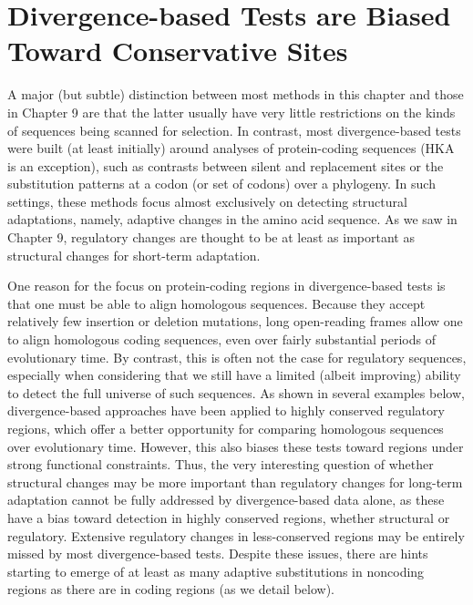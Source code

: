 \documentclass{article}
\begin{document}
\section{Divergence-based Tests are Biased Toward Conservative Sites}
A major (but subtle) distinction between most methods in this chapter and those in Chapter 9 are that the latter usually have very little restrictions on the kinds of sequences being scanned for selection. In contrast, most divergence-based tests were built (at least initially) around analyses of protein-coding sequences (HKA is an exception), such as contrasts between silent and replacement sites or the substitution patterns at a codon (or set of codons) over a phylogeny. In such settings, these methods focus almost exclusively on detecting structural adaptations, namely, adaptive changes in the amino acid sequence. As we saw in Chapter 9, regulatory changes are thought to be at least as important as structural changes for short-term adaptation.

One reason for the focus on protein-coding regions in divergence-based tests is that one must be able to align homologous sequences. Because they accept relatively few insertion or deletion mutations, long open-reading frames allow one to align homologous coding sequences, even over fairly substantial periods of evolutionary time. By contrast, this is often not the case for regulatory sequences, especially when considering that we still have a limited (albeit improving) ability to detect the full universe of such sequences. As shown in several examples below, divergence-based approaches have been applied to highly conserved regulatory regions, which offer a better opportunity for comparing homologous sequences over evolutionary time. However, this also biases these tests toward regions under strong functional constraints. Thus, the very interesting question of whether structural changes may be more important than regulatory changes for long-term adaptation cannot be fully addressed by divergence-based data alone, as these have a bias toward detection in highly conserved regions, whether structural or regulatory. Extensive regulatory changes in less-conserved regions may be entirely missed by most divergence-based tests. Despite these issues, there are hints starting to emerge of at least as many adaptive substitutions in noncoding regions as there are in coding regions (as we detail below).
\end{document}
